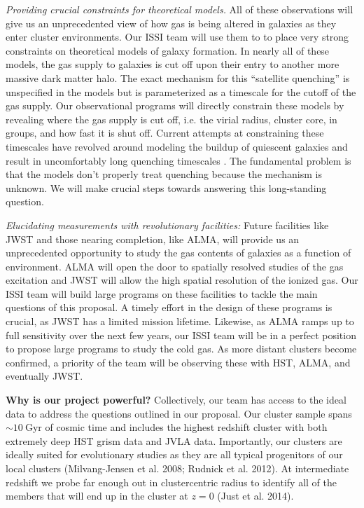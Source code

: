 \documentclass[11pt]{article}
\begin{document}
\textit{Providing crucial constraints for theoretical models.} All of
these observations will give us an unprecedented view of how gas is
being altered in galaxies as they enter cluster environments.  Our
ISSI team will use them to to place very strong constraints on
theoretical models of galaxy formation.  In nearly all of these
models, the gas supply to galaxies is cut off upon their entry to
another more massive dark matter halo.  The exact mechanism for this
``satellite quenching'' is unspecified in the models but is
parameterized as a timescale for the cutoff of the gas supply.  Our
observational programs will directly constrain these models by revealing where the gas supply is cut off, i.e. the virial radius, cluster
core, in groups, and how fast it is shut off.  Current
attempts at constraining these timescales have revolved around
modeling the buildup of quiescent galaxies and result in uncomfortably
long quenching timescales \citep{McGee11,DeLucia12a}. The fundamental
problem is that the models don't properly treat quenching because the
mechanism is unknown.  We will make crucial steps towards answering
this long-standing question.

\textit{Elucidating measurements with revolutionary facilities:}
Future facilities like JWST and those nearing completion, like ALMA,
will provide us an unprecedented opportunity to study the gas contents
of galaxies as a function of environment.  ALMA will open the door to
spatially resolved studies of the gas excitation and JWST will allow
the high spatial resolution of the ionized gas.  Our ISSI team will
build large programs on these facilities to tackle the main questions
of this proposal.  A timely effort in the design of these programs is
crucial, as JWST has a limited mission lifetime.  Likewise, as ALMA
ramps up to full sensitivity over the next few years, our ISSI team
will be in a perfect position to propose large programs to study the
cold gas.  As more distant clusters become confirmed, a priority of
the team will be observing these with HST, ALMA, and eventually JWST.

\textbf{Why is our project powerful?}  Collectively, our team has
access to the ideal data to address the questions outlined in our
proposal.  Our cluster sample spans $\sim10~$Gyr of cosmic time and
includes the highest redshift cluster with both extremely deep HST
grism data and JVLA data.  Importantly, our clusters are ideally
suited for evolutionary studies as they are all typical progenitors of
our local clusters (Milvang-Jensen et al. 2008; Rudnick et al. 2012).
At intermediate redshift we probe far enough out in clustercentric
radius to identify all of the members that will end up in the cluster
at $z=0$ (Just et al. 2014).
\end{document}

